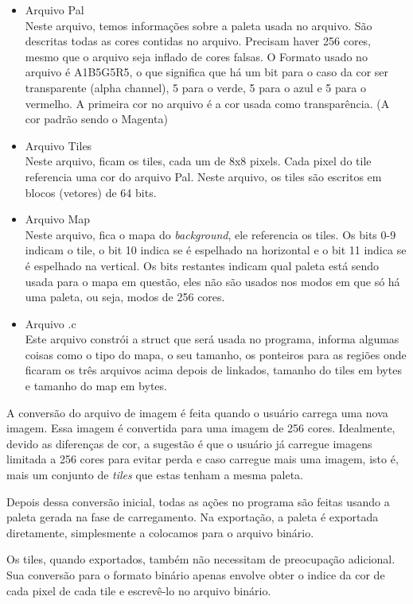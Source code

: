\documentclass[brazil]{abnt}
\begin{document}
\begin{itemize}
 \item Arquivo Pal\\
 Neste arquivo, temos informações sobre a paleta usada no arquivo. São descritas todas as cores contidas no arquivo. Precisam haver 256 cores, mesmo que o arquivo seja inflado de cores falsas. O Formato usado no arquivo é A1B5G5R5, o que significa que há um bit para o caso da cor ser transparente (alpha channel), 5 para o verde, 5 para o azul e 5 para o vermelho. A primeira cor no arquivo é a cor usada como transparência. (A cor padrão sendo o Magenta)
 \item Arquivo Tiles\\
 Neste arquivo, ficam os tiles, cada um de 8x8 pixels. Cada pixel do tile referencia uma cor do arquivo Pal. Neste arquivo, os tiles são escritos em blocos (vetores) de 64 bits. 
 \item Arquivo Map\\
 Neste arquivo, fica o mapa do \textit{background}, ele referencia os tiles. Os bits 0-9 indicam o tile, o bit 10 indica se é espelhado na horizontal e o bit 11 indica se é espelhado na vertical. Os bits restantes indicam qual paleta está sendo usada para o mapa em questão, eles não são usados nos modos em que só há uma paleta, ou seja, modos de 256 cores.
 \item Arquivo .c\\
 Este arquivo constrói a struct que será usada no programa, informa algumas coisas como o tipo do mapa, o seu tamanho, os ponteiros para as regiões onde ficaram os três arquivos acima depois de linkados, tamanho do tiles em bytes e tamanho do map em bytes. 
\end{itemize}

A conversão do arquivo de imagem é feita quando o usuário carrega uma nova imagem. Essa imagem é convertida para uma imagem de 256 cores. Idealmente, devido as diferenças de cor, a sugestão é que o usuário já carregue imagens limitada a 256 cores para evitar perda e caso carregue mais uma imagem, isto é, mais um conjunto de \textit{tiles} que estas tenham a mesma paleta.

Depois dessa conversão inicial, todas as ações no programa são feitas usando a paleta gerada na fase de carregamento. Na exportação, a paleta é exportada diretamente, simplesmente a colocamos para o arquivo binário.

Os tiles, quando exportados, também não necessitam de preocupação adicional. Sua conversão para o formato binário apenas envolve obter o indice da cor de cada pixel de cada tile e escrevê-lo no arquivo binário.
\end{document}
